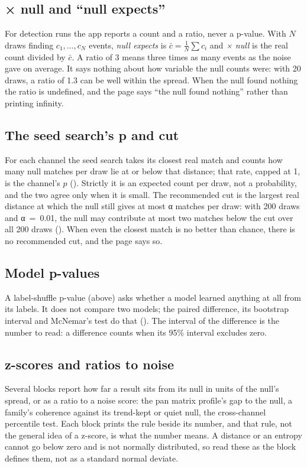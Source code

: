 \subsection{× null and ``null expects''}
For detection runs the app reports a count and a ratio, never a p-value. With $N$ draws
finding $c_1,\dots,c_N$ events, \emph{null expects} is $\bar c = \frac1N\sum c_i$ and
\emph{× null} is the real count divided by $\bar c$. A ratio of 3 means three times as many
events as the noise gave on average. It says nothing about how variable the null counts were:
with 20 draws, a ratio of 1.3 can be well within the spread. When the null found nothing the
ratio is undefined, and the page says ``the null found nothing'' rather than printing
infinity.

\subsection{The seed search's p and cut}
For each channel the seed search takes its closest real match and counts how many null matches
per draw lie at or below that distance; that rate, capped at 1, is the channel's $p$
(). Strictly it is an expected count per draw, not a
probability, and the two agree only when it is small. The recommended cut is the largest real
distance at which the null still gives at most α matches per draw: with 200 draws and
α~=~0.01, the null may contribute at most two matches below the cut over all 200 draws
(). When even the closest match is no better than chance, there is no
recommended cut, and the page says so.

\subsection{Model p-values}
A label-shuffle p-value (above) asks whether a model learned anything at all from its labels.
It does not compare two models; the paired difference, its bootstrap interval and McNemar's
test do that (). The interval of the difference is the number to read:
a difference counts when its 95\% interval excludes zero.

\subsection{z-scores and ratios to noise}
Several blocks report how far a result sits from its null in units of the null's spread, or as
a ratio to a noise score: the pan matrix profile's gap to the null, a family's coherence
against its trend-kept or quiet null, the cross-channel percentile test. Each block prints the
rule beside its number, and that rule, not the general idea of a z-score, is what the number
means. A distance or an entropy cannot go below zero and is not normally distributed, so read
these as the block defines them, not as a standard normal deviate.

